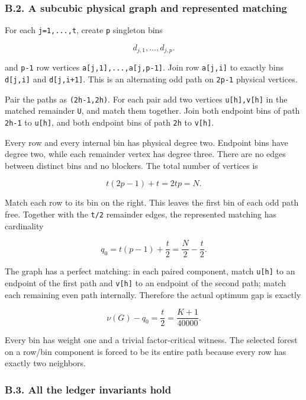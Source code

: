 \hypertarget{af-f687f276ee-b.2.-a-subcubic-physical-graph-and-represented-matching}{%
\subsubsection{B.2. A subcubic physical graph and represented matching}\label{af-f687f276ee-b.2.-a-subcubic-physical-graph-and-represented-matching}}

For each \texttt{j=1,...,t}, create \texttt{p} singleton bins

\[
d_{j,1},\ldots,d_{j,p}.
\]

and \texttt{p-1} row vertices \texttt{a{[}j,1{]},...,a{[}j,p-1{]}}. Join row \texttt{a{[}j,i{]}} to exactly bins \texttt{d{[}j,i{]}} and \texttt{d{[}j,i+1{]}}. This is an alternating odd path on \texttt{2p-1} physical vertices.

Pair the paths as \texttt{(2h-1,2h)}. For each pair add two vertices \texttt{u{[}h{]},v{[}h{]}} in the matched remainder \texttt{U}, and match them together. Join both endpoint bins of path \texttt{2h-1} to \texttt{u{[}h{]}}, and both endpoint bins of path \texttt{2h} to \texttt{v{[}h{]}}.

Every row and every internal bin has physical degree two. Endpoint bins have degree two, while each remainder vertex has degree three. There are no edges between distinct bins and no blockers. The total number of vertices is

\[
t(2p-1)+t=2tp=N.
\]

Match each row to its bin on the right. This leaves the first bin of each odd path free. Together with the \texttt{t/2} remainder edges, the represented matching has cardinality

\[
q_0=t(p-1)+\frac t2=\frac N2-\frac t2.\tag{2}
\]

The graph has a perfect matching: in each paired component, match \texttt{u{[}h{]}} to an endpoint of the first path and \texttt{v{[}h{]}} to an endpoint of the second path; match each remaining even path internally. Therefore the actual optimum gap is exactly

\[
\nu(G)-q_0=\frac t2=\frac{K+1}{40000}.\tag{3}
\]

Every bin has weight one and a trivial factor-critical witness. The selected forest on a row/bin component is forced to be its entire path because every row has exactly two neighbors.

\hypertarget{af-f687f276ee-b.3.-all-the-ledger-invariants-hold}{%
\subsubsection{B.3. All the ledger invariants hold}\label{af-f687f276ee-b.3.-all-the-ledger-invariants-hold}}

